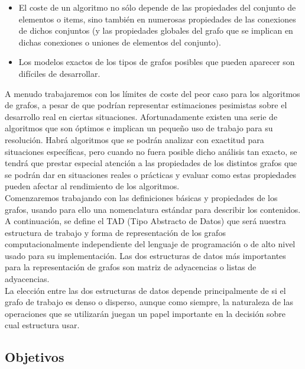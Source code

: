 \documentclass[a4paper,12pt]{article}
\begin{document}
\begin{itemize}
  
\item El coste de un algoritmo no sólo depende de las propiedades del conjunto de elementos o items, sino también en numerosas propiedades de las conexiones de dichos conjuntos (y las propiedades globales del grafo que se implican en dichas conexiones o uniones de elementos del conjunto).

\item Los modelos exactos de los tipos de grafos posibles que pueden aparecer son difíciles de desarrollar.

\end{itemize}

A menudo trabajaremos con los límites de coste del peor caso para los algoritmos de grafos, a pesar de que podrían representar estimaciones pesimistas sobre el desarrollo real en ciertas situaciones. Afortunadamente existen una serie de algoritmos que son óptimos e implican un pequeño uso de trabajo para su resolución. Habrá algoritmos que se podrán analizar con exactitud para situaciones específicas, pero cuando no fuera posible dicho análisis tan exacto, se tendrá que prestar especial atención a las propiedades de los distintos grafos que se podrán dar en situaciones reales o prácticas y evaluar como estas propiedades pueden afectar al rendimiento de los algoritmos.\\

Comenzaremos trabajando con las definiciones básicas y propiedades de los grafos, usando para ello una nomenclatura estándar para describir los contenidos. A continuación, se define el TAD (Tipo Abstracto de Datos) que será nuestra estructura de trabajo y forma de representación de los grafos computacionalmente independiente del lenguaje de programación o de alto nivel usado para su implementación. Las dos estructuras de datos más importantes para la representación de grafos son matriz de adyacencias o listas de adyacencias.\\

La elección entre las dos estructuras de datos depende principalmente de si el grafo de trabajo es denso o disperso, aunque como siempre, la naturaleza de las operaciones que se utilizarán juegan un papel importante en la decisión sobre cual estructura usar.\\

\subsection{Objetivos}
\end{document}
